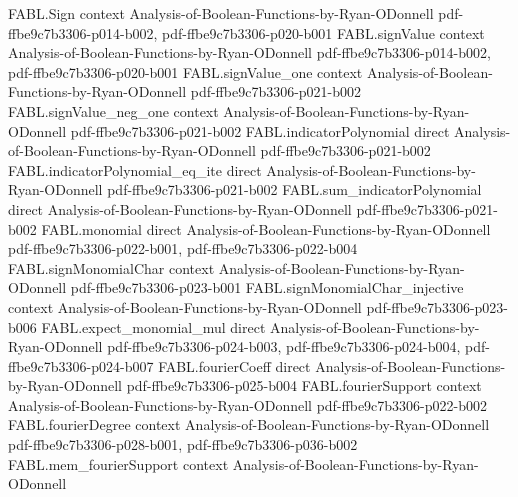 \begin{theorem}
\label{FABL.corollary5_23}
\leanok
{}
\proofstep
  {FABL.Sign}
  {context}
  {Analysis-of-Boolean-Functions-by-Ryan-ODonnell}
  {pdf-ffbe9c7b3306-p014-b002,
    pdf-ffbe9c7b3306-p020-b001}
\proofstep
  {FABL.signValue}
  {context}
  {Analysis-of-Boolean-Functions-by-Ryan-ODonnell}
  {pdf-ffbe9c7b3306-p014-b002,
    pdf-ffbe9c7b3306-p020-b001}
\proofstep
  {FABL.signValue_one}
  {context}
  {Analysis-of-Boolean-Functions-by-Ryan-ODonnell}
  {pdf-ffbe9c7b3306-p021-b002}
\proofstep
  {FABL.signValue_neg_one}
  {context}
  {Analysis-of-Boolean-Functions-by-Ryan-ODonnell}
  {pdf-ffbe9c7b3306-p021-b002}
\proofstep
  {FABL.indicatorPolynomial}
  {direct}
  {Analysis-of-Boolean-Functions-by-Ryan-ODonnell}
  {pdf-ffbe9c7b3306-p021-b002}
\proofstep
  {FABL.indicatorPolynomial_eq_ite}
  {direct}
  {Analysis-of-Boolean-Functions-by-Ryan-ODonnell}
  {pdf-ffbe9c7b3306-p021-b002}
\proofstep
  {FABL.sum_indicatorPolynomial}
  {direct}
  {Analysis-of-Boolean-Functions-by-Ryan-ODonnell}
  {pdf-ffbe9c7b3306-p021-b002}
\proofstep
  {FABL.monomial}
  {direct}
  {Analysis-of-Boolean-Functions-by-Ryan-ODonnell}
  {pdf-ffbe9c7b3306-p022-b001,
    pdf-ffbe9c7b3306-p022-b004}
\proofstep
  {FABL.signMonomialChar}
  {context}
  {Analysis-of-Boolean-Functions-by-Ryan-ODonnell}
  {pdf-ffbe9c7b3306-p023-b001}
\proofstep
  {FABL.signMonomialChar_injective}
  {context}
  {Analysis-of-Boolean-Functions-by-Ryan-ODonnell}
  {pdf-ffbe9c7b3306-p023-b006}
\proofstep
  {FABL.expect_monomial_mul}
  {direct}
  {Analysis-of-Boolean-Functions-by-Ryan-ODonnell}
  {pdf-ffbe9c7b3306-p024-b003,
    pdf-ffbe9c7b3306-p024-b004,
    pdf-ffbe9c7b3306-p024-b007}
\proofstep
  {FABL.fourierCoeff}
  {direct}
  {Analysis-of-Boolean-Functions-by-Ryan-ODonnell}
  {pdf-ffbe9c7b3306-p025-b004}
\proofstep
  {FABL.fourierSupport}
  {context}
  {Analysis-of-Boolean-Functions-by-Ryan-ODonnell}
  {pdf-ffbe9c7b3306-p022-b002}
\proofstep
  {FABL.fourierDegree}
  {context}
  {Analysis-of-Boolean-Functions-by-Ryan-ODonnell}
  {pdf-ffbe9c7b3306-p028-b001,
    pdf-ffbe9c7b3306-p036-b002}
\proofstep
  {FABL.mem_fourierSupport}
  {context}
  {Analysis-of-Boolean-Functions-by-Ryan-ODonnell}

\end{theorem}
